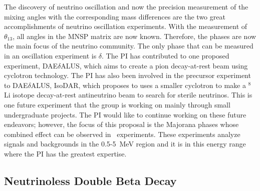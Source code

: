 The discovery of neutrino oscillation and now the precision measurement of the mixing angles with the corresponding mass differences are the two great accomplishments of neutrino oscillation experiments. With the measurement of $\theta_{13}$, all angles in the MNSP matrix are now known. Therefore, the phases are now the main focus of the neutrino community. The only phase that can be measured in an oscillation experiment is $\delta$. The PI has contributed to one proposed experiment, DAE$\delta$ALUS\cite{Alonso:2010fs}, which aims to create a pion decay-at-rest beam using cyclotron technology. The PI has also been involved in the precursor experiment to DAE$\delta$ALUS, IsoDAR, which proposes to uses a smaller cyclotron to make a $^{8}$Li isotope decay-at-rest antineutrino beam to search for sterile neutrinos. This is one future experiment that the group is working on mainly through small undergraduate projects. The PI would like to continue working on these future endeavors; however, the focus of this proposal is the Majorana phases whose combined effect can be observed in \zeronu~experiments. These experiments analyze signals and backgrounds in the 0.5-5~MeV region and it is in this energy range where the PI has the greatest expertise.

\subsection{Neutrinoless Double Beta Decay}

